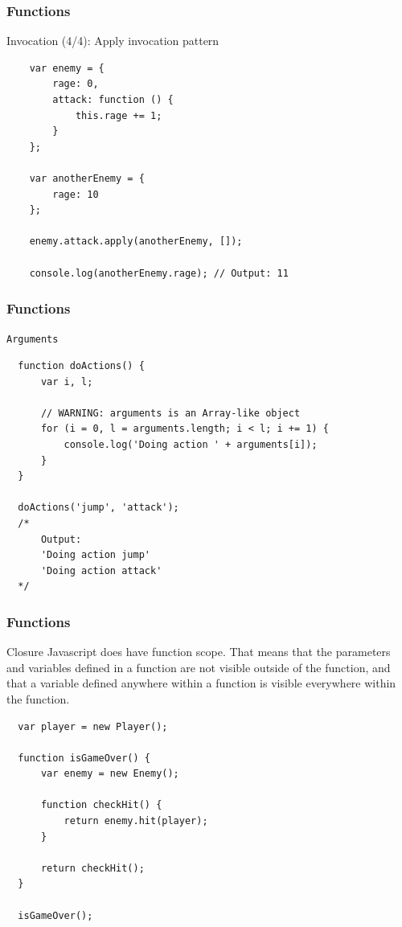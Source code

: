 \begin{frame}[fragile]
  \frametitle{Functions}

  \begin{block}{Invocation (4/4): Apply invocation pattern}
    {\scriptsize
    \begin{verbatim}
    var enemy = {
        rage: 0,
        attack: function () {
            this.rage += 1;
        }
    };

    var anotherEnemy = {
        rage: 10
    };

    enemy.attack.apply(anotherEnemy, []);

    console.log(anotherEnemy.rage); // Output: 11
    \end{verbatim}
    }
  \end{block}
\end{frame}

\begin{frame}[fragile]
  \frametitle{Functions}

  \begin{block}{\texttt{Arguments}}
  {\scriptsize
  \begin{verbatim}
  function doActions() {
      var i, l;

      // WARNING: arguments is an Array-like object
      for (i = 0, l = arguments.length; i < l; i += 1) {
          console.log('Doing action ' + arguments[i]);
      }
  }

  doActions('jump', 'attack');
  /*
      Output:
      'Doing action jump'
      'Doing action attack'
  */
  \end{verbatim}
  }
  \end{block}
\end{frame}

\begin{frame}[fragile]
  \frametitle{Functions}

  \begin{block}{Closure}
  Javascript does have function scope. That means that the parameters and variables defined in a function are not visible outside of the function, and that a variable defined anywhere within a function is visible everywhere within the function.
  {\scriptsize
  \begin{verbatim}
  var player = new Player();

  function isGameOver() {
      var enemy = new Enemy();

      function checkHit() {
          return enemy.hit(player);
      }

      return checkHit();
  }

  isGameOver();
  \end{verbatim}
  }
  \end{block}

\end{frame}

